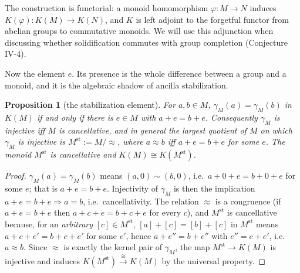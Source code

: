 \documentclass[12pt]{article}
\newcommand{\st}{\mathrm{st}}                  %
\newcommand{\Groth}{K}                       %
\newtheorem{proposition}[proposition]{Proposition}
\theoremstyle{definition}
\theoremstyle{remark}
\theoremstyle{plain}
\begin{document}
The construction is functorial: a monoid homomorphism $\varphi:M\to N$ induces
$\Groth(\varphi):\Groth(M)\to\Groth(N)$, and $\Groth$ is left adjoint to the
forgetful functor from abelian groups to commutative monoids. We will use this
adjunction when discussing whether solidification commutes with group completion
(Conjecture IV-4).

Now the element $e$. Its presence is the whole difference between a group and a
monoid, and it is the algebraic shadow of ancilla stabilization.

\begin{proposition}[the stabilization element]
\label{prop:stable}
For $a,b\in M$, $\gamma_M(a)=\gamma_M(b)$ in $\Groth(M)$ if and only if there is
$e\in M$ with $a+e=b+e$. Consequently $\gamma_M$ is injective iff $M$ is
cancellative, and in general the largest quotient of $M$ on which $\gamma_M$ is
injective is $M^{\st}:=M/{\approx}$, where $a\approx b$ iff $a+e=b+e$ for some
$e$. The monoid $M^{\st}$ is cancellative and
$\Groth(M)\cong\Groth(M^{\st})$.
\end{proposition}

\begin{proof}
$\gamma_M(a)=\gamma_M(b)$ means $(a,0)\sim(b,0)$, i.e.\ $a+0+e=b+0+e$ for some
$e$; that is $a+e=b+e$. Injectivity of $\gamma_M$ is then the implication
$a+e=b+e\Rightarrow a=b$, i.e.\ cancellativity. The relation $\approx$ is a
congruence (if $a+e=b+e$ then $a+c+e=b+c+e$ for every $c$), and $M^{\st}$ is
cancellative because, for an \emph{arbitrary} $[c]\in M^{\st}$,
$[a]+[c]=[b]+[c]$ in $M^{\st}$ means $a+c+e'=b+c+e'$ for some $e'$, hence
$a+e''=b+e''$ with $e''=c+e'$, i.e.\ $a\approx b$. Since $\approx$ is exactly the
kernel pair of $\gamma_M$, the map
$M^{\st}\to\Groth(M)$ is injective and induces
$\Groth(M^{\st})\xrightarrow{\ \cong\ }\Groth(M)$ by the universal property.
\end{proof}
\end{document}
